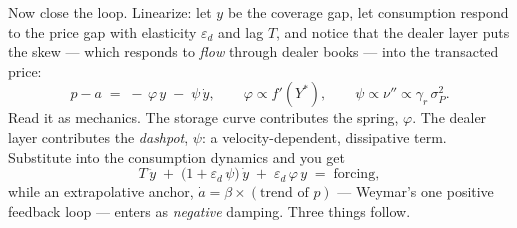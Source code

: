 \documentclass[11pt]{article}
\begin{document}
Now close the loop. Linearize: let $y$ be the coverage gap, let consumption respond to the price gap with elasticity $\varepsilon_d$ and lag $T$, and notice that the dealer layer puts the skew --- which responds to \emph{flow} through dealer books --- into the transacted price:
\begin{equation}
p - a \;=\; -\,\varphi\, y \;-\; \psi\, \dot y ,
\qquad \varphi \propto f'(Y^*),
\qquad \psi \propto \nu'' \propto \gamma_r\, \sigma_P^2 .
\label{eq:pricegap}
\end{equation}
Read it as mechanics. The storage curve contributes the spring, $\varphi$. The dealer layer contributes the \emph{dashpot}, $\psi$: a velocity-dependent, dissipative term. Substitute into the consumption dynamics and you get
\begin{equation}
T\,\ddot y \;+\; \big(1 + \varepsilon_d\, \psi\big)\,\dot y \;+\; \varepsilon_d\, \varphi\, y \;=\; \text{forcing},
\label{eq:oscillator}
\end{equation}
while an extrapolative anchor, $\dot a = \beta \times (\text{trend of } p)$ --- Weymar's one positive feedback loop --- enters as \emph{negative} damping. Three things follow.
\end{document}
